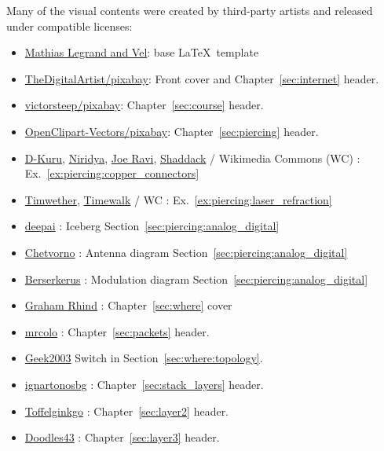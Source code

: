 \noindent Many of the visual contents were created by third-party artists and released under compatible licenses:
\begin{itemize}
\item \href{https://www.overleaf.com/latex/templates/the-legrand-orange-book-template-english/jtctyfmnpppc}{Mathias Legrand and Vel}: base \LaTeX\ template
\item \href{https://pixabay.com/users/thedigitalartist-202249/}{TheDigitalArtist/pixabay}: Front cover and Chapter~\ref{sec:internet} header.
\item \href{https://pixabay.com/users/victorsteep-9526460/}{victorsteep/pixabay}: Chapter~\ref{sec:course} header.
\item \href{https://pixabay.com/users/openclipart-vectors-30363/}{OpenClipart-Vectors/pixabay}: Chapter~\ref{sec:piercing} header.
\item 
\href{https://en.wikipedia.org/wiki/File:HDMI_connector-male_2_sharp_PNr\%C2\%B00059.jpg}{D-Kuru},
\href{https://commons.wikimedia.org/wiki/File:USB_Type-C_icon.svg}{Niridya},
\href{https://commons.wikimedia.org/wiki/File:N_Connector.jpg}{Joe Ravi},
\href{https://en.wikipedia.org/wiki/File:Photo-RJ11-MF.jpg}{Shaddack}
/ Wikimedia Commons (WC) : Ex.~\ref{ex:piercing:copper_connectors}
\item \href{https://en.wikipedia.org/wiki/File:Laser_in_fibre.jpg}{Timwether}, \href{https://commons.wikimedia.org/wiki/File:MMF_optical.jpg}{Timewalk} / WC : Ex.~\ref{ex:piercing:laser_refraction}
\item \href{https://deepai.org/machine-learning-model/text2img}{deepai} : Iceberg Section~\ref{sec:piercing:analog_digital}
\item \href{https://commons.wikimedia.org/wiki/File:Dipole_receiving_antenna_animation_6_300ms.gif}{Chetvorno} : Antenna diagram Section~\ref{sec:piercing:analog_digital}
\item \href{https://commons.wikimedia.org/wiki/File:Amfm3-en-de.gif}{Berserkerus} : Modulation diagram Section~\ref{sec:piercing:analog_digital}
\item \href{https://www.pinterest.com/pin/118289927683058369/}{Graham Rhind} : Chapter~\ref{sec:where} cover
\item \href{https://pixabay.com/photos/container-goods-ship-port-cargo-4675851/}{mrcolo} : Chapter~\ref{sec:packets} header.
\item \href{https://commons.wikimedia.org/wiki/File:2550T-PWR-Front.jpg}{Geek2003} Switch in Section~\ref{sec:where:topology}.
\item \href{https://pixabay.com/photos/vegetable-onion-flavor-ingredient-6829271/}{ignartonosbg} : Chapter~\ref{sec:stack_layers} header.
\item \href{https://commons.wikimedia.org/wiki/File:Winter_2004_DreamHack_LAN_Party.jpg}{Toffelginkgo} : Chapter~\ref{sec:layer2} header.
\item \href{https://pixabay.com/photos/golden-gate-bridge-san-francisco-1549662/}{Doodles43} : Chapter~\ref{sec:layer3} header.
\end{itemize}
